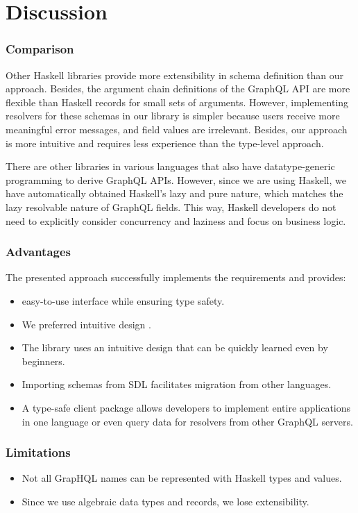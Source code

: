 \section{Discussion}


\begin{frame}\frametitle{Comparison}

    Other Haskell libraries provide more extensibility in schema definition than our approach. Besides, the argument chain definitions of the GraphQL API are more flexible than Haskell records for small sets of arguments. However, implementing resolvers for these schemas in our library is simpler because users receive more meaningful error messages, and field values are irrelevant. Besides, our approach is more intuitive and requires less experience than the type-level approach.
    
    There are other libraries in various languages that also have datatype-generic programming to derive GraphQL APIs. However, since we are using Haskell, we have automatically obtained Haskell's lazy and pure nature, which matches the lazy resolvable nature of GraphQL fields. This way, Haskell developers do not need to explicitly consider concurrency and laziness and focus on business logic. 
\end{frame}
    
\begin{frame}\frametitle{Advantages}

The presented approach successfully implements the requirements and provides:

\begin{itemize}
    \item easy-to-use interface while ensuring type safety.
    \item We preferred intuitive design .
    \item The library uses an intuitive design that can be quickly learned even by beginners.
    \item Importing schemas from SDL facilitates migration from other languages.
    \item A type-safe client package allows developers to implement entire applications in one language or even query data for resolvers from other GraphQL servers.
\end{itemize}

\end{frame}

\begin{frame}\frametitle{Limitations}

\begin{itemize}
    \item Not all GrapHQL names can be represented with Haskell types and values.
    \item Since we use algebraic data types and records, we lose extensibility.
\end{itemize}

\end{frame}

